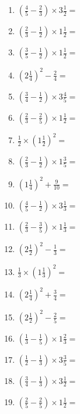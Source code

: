 \documentclass[12pt]{article}
\begin{document}
\begin{enumerate}
\item \large $ \left( \frac{4}{5} - \frac{2}{3} \right) \times 3 \frac{1}{2} = $ \vspace{1.6cm}
\item \large $ \left( \frac{2}{3} - \frac{1}{2} \right) \times 1 \frac{1}{2} = $ \vspace{1.6cm}
\item \large $ \left( \frac{3}{5} - \frac{1}{2} \right) \times 1 \frac{1}{2} = $ \vspace{1.6cm}
\item \large $ \left( 2 \frac{1}{4} \right)^2 - \frac{2}{4} = $ \vspace{1.6cm}
\item \large $ \left( \frac{3}{4} - \frac{1}{2} \right) \times 3 \frac{4}{5} = $ \vspace{1.6cm}
\item \large $ \left( \frac{2}{3} - \frac{2}{5} \right) \times 1 \frac{1}{2} = $ \vspace{1.6cm}
\item \large $ \frac{1}{2} \times \left( 1 \frac{1}{2} \right)^2 = $ \vspace{1.6cm}
\item \large $ \left( \frac{2}{3} - \frac{1}{2} \right) \times 1 \frac{3}{5} = $ \vspace{1.6cm}
\item \large $ \left( 1 \frac{1}{4} \right)^2 + \frac{9}{10} = $ \vspace{1.6cm}
\newpage
\item \large $ \left( \frac{4}{5} - \frac{1}{2} \right) \times 3 \frac{1}{3} = $ \vspace{1.6cm}
\item \large $ \left( \frac{2}{3} - \frac{3}{5} \right) \times 1 \frac{1}{3} = $ \vspace{1.6cm}
\item \large $ \left( 2 \frac{1}{2} \right)^2 - \frac{1}{3} = $ \vspace{1.6cm}
\item \large $ \frac{1}{3} \times \left( 1 \frac{1}{3} \right)^2 = $ \vspace{1.6cm}
\item \large $ \left( 2 \frac{1}{4} \right)^2 + \frac{3}{4} = $ \vspace{1.6cm}
\item \large $ \left( 2 \frac{1}{2} \right)^2 - \frac{2}{5} = $ \vspace{1.6cm}
\item \large $ \left( \frac{1}{3} - \frac{1}{5} \right) \times 1 \frac{2}{3} = $ \vspace{1.6cm}
\item \large $ \left( \frac{1}{2} - \frac{1}{3} \right) \times 3 \frac{3}{5} = $ \vspace{1.6cm}
\item \large $ \left( \frac{3}{4} - \frac{1}{3} \right) \times 3 \frac{1}{2} = $ \vspace{1.6cm}
\item \large $ \left( \frac{2}{5} - \frac{2}{5} \right) \times 1 \frac{1}{2} = $ \vspace{1.6cm}
\end{enumerate}\newpage
\end{document}
